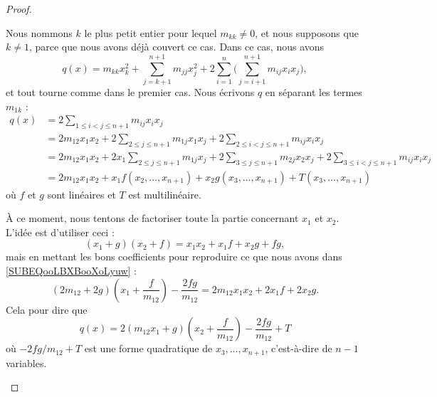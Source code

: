 \begin{proof}
\begin{subproof}
		Nous nommons \( k\) le plus petit entier pour lequel \( m_{kk}\neq 0\), et nous supposons que \( k\neq 1\), parce que nous avons déjà couvert ce cas. Dans ce cas, nous avons
		\begin{equation}
			q(x)=m_{kk}x_k^2+\sum_{j=k+1}^{n+1}m_{jj}x_j^2  +2\sum_{i=1}^n\big( \sum_{j=i+1}^{n+1}m_{ij}x_ix_j \big),
		\end{equation}
		et tout tourne comme dans le premier cas.
		\spitem[\( m_{ii}=0\) pour tout \( i\) et \( m_{12}\neq 0\)]
		Nous écrivons \( q\) en séparant les termes \( m_{1k}\) :
		\begin{subequations}
			\begin{align}
				q(x) & =2\sum_{1\leq i<j\leq n+1}m_{ij}x_ix_j                                                                                       \\
				     & =2m_{12}x_1x_2+2\sum_{2\leq j\leq n+1}m_{1j}x_1x_j+2\sum_{2\leq i<j\leq n+1}m_{ij}x_ix_j                                     \\
				     & =2m_{12}x_1x_2+2x_1\sum_{2\leq j\leq n+1}m_{1j}x_j+2\sum_{3\leq j\leq n+1}m_{2j}x_2x_j+2\sum_{3\leq i<j\leq n+1}m_{ij}x_ix_j \\
				     & =2m_{12}x_1x_2+x_1f(x_2,\ldots, x_{n+1})+x_2g(x_3,\ldots, x_{n+1})+T(x_3,\ldots, x_{n+1})      \label{SUBEQooLBXBooXoLyuw}
			\end{align}
		\end{subequations}
		où \( f\) et \( g\) sont linéaires et \( T\) est multilinéaire.

		À ce moment, nous tentons de factoriser toute la partie concernant \( x_1\) et \( x_2\). L'idée est d'utiliser ceci :
		\begin{equation}
			(x_1+g)(x_2+f)=x_1x_2+x_1f+x_2g+fg,
		\end{equation}
		mais en mettant les bons coefficients pour reproduire ce que nous avons dans \eqref{SUBEQooLBXBooXoLyuw} :
		\begin{equation}
			(2m_{12}+2g)(x_1+\frac{ f }{ m_{12} })-\frac{ 2fg }{ m_{12} }=2m_{12}x_1x_2+2x_1f+2x_2g.
		\end{equation}
		Cela pour dire que
		\begin{equation}
			q(x)=2(m_{12}x_1+g)(x_2+\frac{ f }{ m_{12} })-\frac{ 2fg }{ m_{12} }+T
		\end{equation}
		où \(-2fg/m_{12}+T\) est une forme quadratique de \( x_3,\ldots, x_{n+1}\), c'est-à-dire de \( n-1\) variables.


\end{subproof}
\end{proof}
